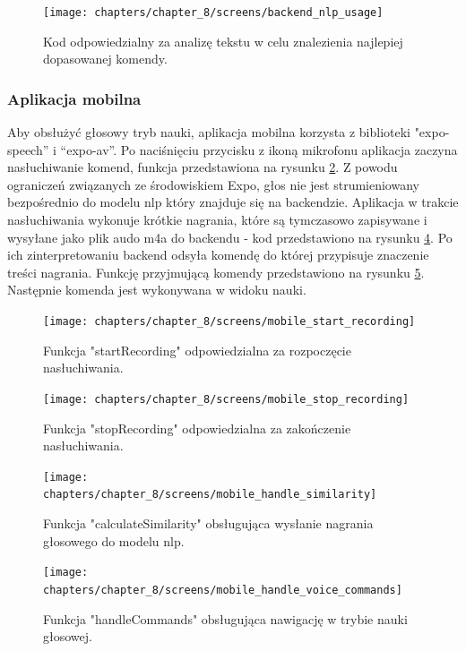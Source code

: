 \begin{figure}[H]
    \centering
    \texttt{[image: chapters/chapter\_8/screens/backend\_nlp\_usage]}
    \caption{Kod odpowiedzialny za analizę tekstu w celu znalezienia najlepiej dopasowanej komendy.}
    \label{img:backend_nlp_usage}
\end{figure}

\subsubsection{Aplikacja mobilna}
Aby obsłużyć głosowy tryb nauki, aplikacja mobilna korzysta z biblioteki "expo-speech” i “expo-av”. Po naciśnięciu przycisku z ikoną mikrofonu aplikacja zaczyna nasłuchiwanie komend, funkcja przedstawiona na rysunku \ref{img:mobile_start_recording}. Z powodu ograniczeń związanych ze środowiskiem Expo, głos nie jest strumieniowany bezpośrednio do modelu nlp który znajduje się na backendzie. Aplikacja w trakcie nasłuchiwania wykonuje krótkie nagrania, które są tymczasowo zapisywane i wysyłane jako plik audo m4a do backendu - kod przedstawiono na rysunku \ref{img:mobile_handle_similarity}. Po ich zinterpretowaniu backend odsyła komendę do której przypisuje znaczenie treści nagrania. Funkcję przyjmującą komendy przedstawiono na rysunku \ref{img:mobile_handle_voice_commands}. Następnie komenda jest wykonywana w widoku nauki.


\begin{figure}[H]
    \centering
    \texttt{[image: chapters/chapter\_8/screens/mobile\_start\_recording]}
    \caption{Funkcja "startRecording" odpowiedzialna za rozpoczęcie nasłuchiwania.}
    \label{img:mobile_start_recording}
\end{figure}

\begin{figure}[H]
    \centering
    \texttt{[image: chapters/chapter\_8/screens/mobile\_stop\_recording]}
    \caption{Funkcja "stopRecording" odpowiedzialna za zakończenie nasłuchiwania.}
    \label{img:mobile_stop_recording}
\end{figure}

\begin{figure}[H]
    \centering
    \texttt{[image: chapters/chapter\_8/screens/mobile\_handle\_similarity]}
    \caption{Funkcja "calculateSimilarity" obsługująca wysłanie nagrania głosowego do modelu nlp.}
    \label{img:mobile_handle_similarity}
\end{figure}

\begin{figure}[H]
    \centering
    \texttt{[image: chapters/chapter\_8/screens/mobile\_handle\_voice\_commands]}
    \caption{Funkcja "handleCommands" obsługująca nawigację w trybie nauki głosowej.}
    \label{img:mobile_handle_voice_commands}
\end{figure}

